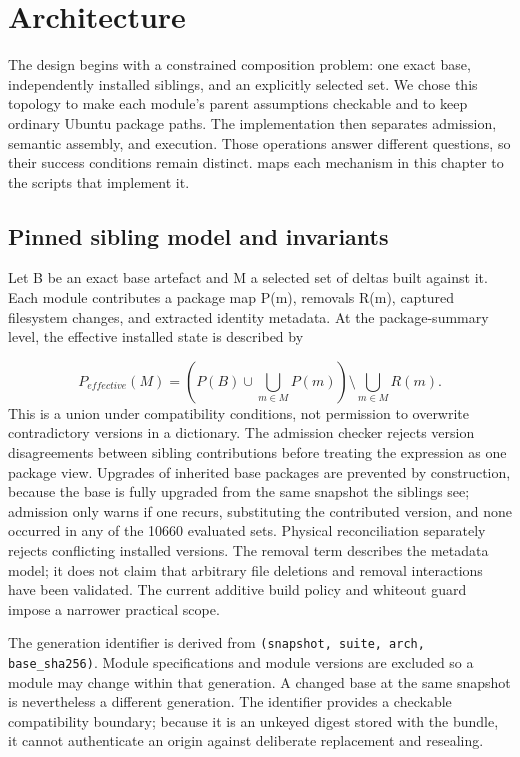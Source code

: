 \chapter{Architecture}
\label{ch:architecture}

The design begins with a constrained composition problem: one exact base, independently installed siblings, and an explicitly selected set. We chose this topology to make each module's parent assumptions checkable and to keep ordinary Ubuntu package paths. The implementation then separates admission, semantic assembly, and execution. Those operations answer different questions, so their success conditions remain distinct.  maps each mechanism in this chapter to the scripts that implement it.

\section{Pinned sibling model and invariants}
\label{sec:arch:siblings}

Let B be an exact base artefact and M a selected set of deltas built against it. Each module contributes a package map P(m), removals R(m), captured filesystem changes, and extracted identity metadata. At the package-summary level, the effective installed state is described by

\begin{equation}
P_{effective}(M)=\left(P(B)\cup\bigcup_{m\in M}P(m)\right)\setminus\bigcup_{m\in M}R(m).
\end{equation}
This is a union under compatibility conditions, not permission to overwrite contradictory versions in a dictionary. The admission checker rejects version disagreements between sibling contributions before treating the expression as one package view. Upgrades of inherited base packages are prevented by construction, because the base is fully upgraded from the same snapshot the siblings see; admission only warns if one recurs, substituting the contributed version, and none occurred in any of the \num{10660} evaluated sets. Physical reconciliation separately rejects conflicting installed versions. The removal term describes the metadata model; it does not claim that arbitrary file deletions and removal interactions have been validated. The current additive build policy and whiteout guard impose a narrower practical scope.

The generation identifier is derived from \texttt{(snapshot, suite, arch, base\_sha256)}. Module specifications and module versions are excluded so a module may change within that generation. A changed base at the same snapshot is nevertheless a different generation. The identifier provides a checkable compatibility boundary; because it is an unkeyed digest stored with the bundle, it cannot authenticate an origin against deliberate replacement and resealing.

